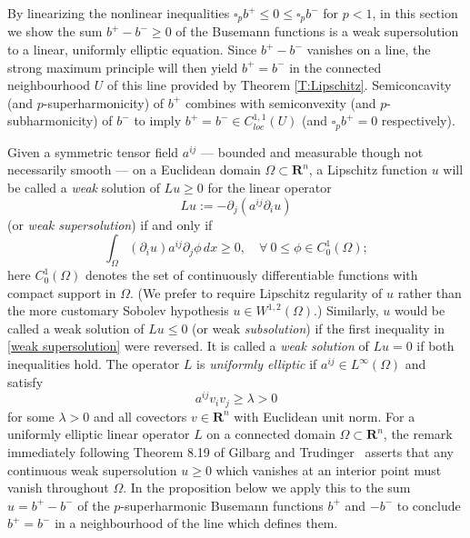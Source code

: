 \documentclass[12pt]{amsart}
\newcommand{\R}{{\mathbf R}}
\newcommand{\p}{{\partial}}
\begin{document}
By linearizing the nonlinear inequalities $\square_p b^+ \le 0 \le \square_p b^-$ for $p<1$, in this section we show the sum $b^+-b^- \ge 0$ of the Busemann functions is a weak supersolution to a linear, uniformly elliptic equation.  Since $b^+-b^-$ vanishes on a line,  the strong maximum principle will then yield $b^+=b^-$ in the connected neighbourhood $U$ of this line provided by Theorem \ref{T:Lipschitz}.  Semiconcavity (and $p$-superharmonicity) of $b^+$ combines with semiconvexity (and $p$-subharmonicity) of $b^-$  to imply $b^+=b^- \in C^{1,1}_{loc}(U)$ (and $\square_p b^+=0$ respectively).  

Given a symmetric tensor field $a^{ij}$ 
--- bounded and measurable though not necessarily smooth --- on a Euclidean domain $\Omega \subset \R^n$,  
a Lipschitz function $u$ will be called a {\em weak} solution of $Lu \ge 0$ for the linear operator
\begin{equation}\label{L}
Lu := - \p_j( a^{ij} \p_i u) %
\end{equation}
(or {\em weak supersolution}) if and only if 
\begin{equation}\label{weak supersolution}
\int_\Omega  ( \p_i u) a^{ij} \p_j \phi 
\,dx \ge 0, \quad \forall\ 0 \le \phi \in C^1_0(\Omega);
\end{equation}
here $C^1_0(\Omega)$ denotes the set of continuously differentiable functions with compact support in $\Omega$.
(We prefer to require Lipschitz regularity of $u$ rather than the more customary Sobolev hypothesis $u \in W^{1,2}(\Omega)$.)
Similarly,  $u$ would be called a weak solution of $Lu \le 0$ (or weak {\em subsolution}) if the first inequality in \eqref{weak supersolution} were reversed.
It is called a {\em weak solution} of $Lu=0$ if both inequalities hold.
The operator $L$ is {\em uniformly elliptic} if $a^{ij} %
\in L^\infty(\Omega)$ and satisfy
\begin{equation}\label{elliptic}
a^{ij} v_i v_j \ge \lambda >0  
\end{equation}
for some $\lambda>0$ and all covectors $v \in \R^n$ with Euclidean unit norm.  
For a uniformly elliptic linear operator $L$ on a connected domain $\Omega \subset \R^n$, the remark immediately following
Theorem 8.19 of Gilbarg and Trudinger~\cite{GilbargTrudinger98} asserts that any continuous weak supersolution $u \ge 0$ which vanishes at an interior point
must vanish throughout $\Omega$.  In the proposition below we apply this to the sum $u=b^+-b^-$ of the $p$-superharmonic Busemann functions $b^+$ and $-b^-$
to conclude $b^+=b^-$ in a neighbourhood of the line which defines them.
\end{document}
